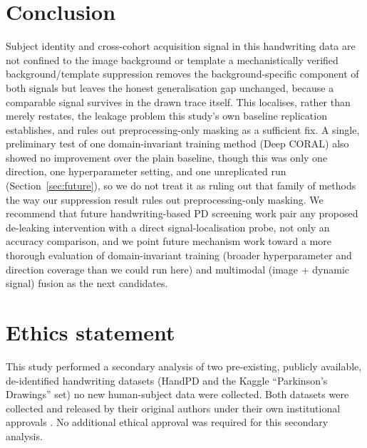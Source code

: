 \documentclass[3p,final,10pt]{elsarticle}
\let\oldsection\section
\renewcommand{\section}{\FloatBarrier\oldsection}
\begin{document}
\section{Conclusion}
Subject identity and cross-cohort acquisition signal in this handwriting
data are not confined to the image background or template a
mechanistically verified background/template suppression removes the
background-specific component of both signals but leaves the honest
generalisation gap unchanged, because a comparable signal survives in the
drawn trace itself. This localises, rather than merely restates, the
leakage problem this study's own baseline replication establishes, and
rules out preprocessing-only masking as a sufficient fix. A single,
preliminary test of one domain-invariant training method (Deep CORAL) also
showed no improvement over the plain baseline, though this was only one
direction, one hyperparameter setting, and one unreplicated run
(Section~\ref{sec:future}), so we do not treat it as ruling out that
family of methods the way our suppression result rules out
preprocessing-only masking. We recommend that future
handwriting-based PD screening work pair any proposed de-leaking
intervention with a direct signal-localisation probe, not only an
accuracy comparison, and we point future mechanism work toward a more
thorough evaluation of domain-invariant training (broader hyperparameter
and direction coverage than we could run here) and multimodal (image +
dynamic signal) fusion as the next candidates.

\section*{Ethics statement}
This study performed a secondary analysis of two pre-existing, publicly
available, de-identified handwriting datasets (HandPD and the Kaggle
``Parkinson's Drawings'' set) no new human-subject data were collected.
Both datasets were collected and released by their original authors under
their own institutional approvals \cite{pereira2015,zham2017}. No additional
ethical approval was required for this secondary analysis.
\end{document}
